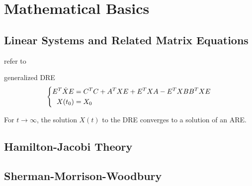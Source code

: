 \chapter{Mathematical Basics}
\section{Linear Systems and Related Matrix Equations}

refer to \cite{Simoncini2016}

generalized \ac{DRE}
\begin{equation}
\label{eq:basics:DRE}
\left\{
\begin{aligned}
  E^T \dot X E &= C^T C + A^T X E + E^T X A - E^T X BB^T X E \\
  X(t_0) &= X_0
\end{aligned}
\right.
\end{equation}

\begin{proposition}
\label{thm:basics:dre-limit-are}
  For $t\to\infty$, the solution $X(t)$ to the \ac{DRE} converges to a solution of an \ac{ARE}.
\end{proposition}

\section{Hamilton-Jacobi Theory}
\section{Sherman-Morrison-Woodbury}
\label{sec:basics:smw}

